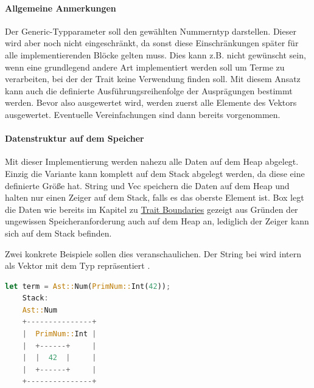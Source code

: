 \documentclass[11pt,a4paper, ngerman]{article}
\begin{document}
\paragraph{Allgemeine Anmerkungen} Der Generic-Typparameter  soll den gewählten Nummerntyp darstellen. Dieser wird aber noch nicht eingeschränkt, da sonst diese Einschränkungen später für alle implementierenden Blöcke gelten muss. Dies kann z.B. nicht gewünscht sein, wenn eine grundlegend andere Art implementiert werden soll um Terme zu verarbeiten, bei der der Trait  keine Verwendung finden soll. Mit diesem Ansatz kann auch die definierte Ausführungsreihenfolge der Ausprägungen bestimmt werden. Bevor also  ausgewertet wird, werden zuerst alle Elemente des Vektors ausgewertet. Eventuelle Vereinfachungen sind dann bereits vorgenommen.

\paragraph{Datenstruktur auf dem Speicher} Mit dieser Implementierung werden nahezu alle Daten auf dem Heap abgelegt. Einzig die Variante  kann komplett auf dem Stack abgelegt werden, da diese eine definierte Größe hat. String und Vec speichern die Daten auf dem Heap und halten nur einen Zeiger auf dem Stack, falls es das oberste Element ist. Box legt die Daten wie bereits im Kapitel zu \hyperref[sec:BoxType]{Trait Boundaries} gezeigt aus Gründen der ungewissen Speicheranforderung auch auf dem Heap an, lediglich der Zeiger kann sich auf dem Stack befinden.

Zwei konkrete Beispiele sollen dies veranschaulichen. Der String bei  wird intern als Vektor mit dem Typ  repräsentiert \cite{StringSrc}.
\begin{lstlisting}[language=rust, caption={Term 1 Stack und Heap}]
    let term = Ast::Num(PrimNum::Int(42));
    Stack:
    Ast::Num
    +---------------+
    |  PrimNum::Int |
    |  +------+     |
    |  |  42  |     |
    |  +------+     |
    +---------------+
\end{lstlisting}

\newpage
\end{document}
